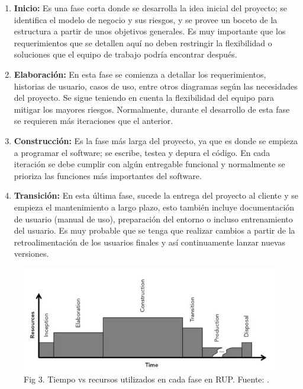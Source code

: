 \begin{enumerate}
  \item \textbf{Inicio:} Es una fase corta donde se desarrolla la idea inicial del proyecto; se identifica el modelo de negocio y sus riesgos, y se provee un boceto de la estructura a partir de unos objetivos generales. Es muy importante que los requerimientos que se detallen aquí no deben restringir la flexibilidad o soluciones que el equipo de trabajo podría encontrar después.
  \item \textbf{Elaboración:} En esta fase se comienza a detallar los requerimientos, historias de usuario, casos de uso, entre otros diagramas según las necesidades del proyecto. Se sigue teniendo en cuenta la flexibilidad del equipo para mitigar los mayores riesgos. Normalmente, durante el desarrollo de esta fase se requieren más iteraciones que el anterior.
  \item \textbf{Construcción:} Es la fase más larga del proyecto, ya que es donde se empieza a programar el software; se escribe, testea y depura el código. En cada iteración se debe cumplir con algún entregable funcional y normalmente se prioriza las funciones más importantes del software.
  \item \textbf{Transición:} En esta última fase, sucede la entrega del proyecto al cliente y se empieza el mantenimiento a largo plazo, esto también incluye documentación de usuario (manual de uso), preparación del entorno o incluso entrenamiento del usuario. Es muy probable que se tenga que realizar cambios a partir de la retroalimentación de los usuarios finales y así continuamente lanzar nuevas versiones.
\end{enumerate}

\begin{figure}[H]\centering
  \includegraphics[width=\linewidth]{figures/fig3_rup_tiempo_vs_recursos.jpg}
  \caption{Fig 3. Tiempo vs recursos utilizados en cada fase en RUP. Fuente: \autocite[p.~296]{anderson2003}.}
  \label{fig:fig3_rup_tiempo_vs_recursos}
\end{figure}

